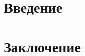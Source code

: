 \chapter*{Введение}

\pagebreak %

\chapter{}

\pagebreak %

\chapter*{Заключение}

\newpage %
\renewcommand{\bibname}{Список литературы}

\begin{thebibliography}{9} 
\end{thebibliography}